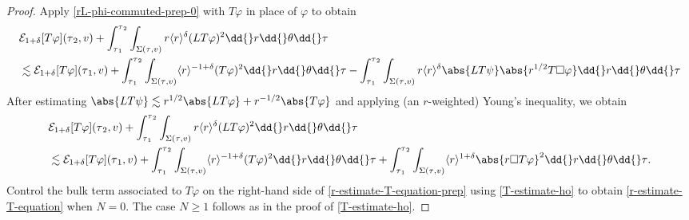 \documentclass[10pt, reqno]{amsart}
\begin{document}
\begin{proof}
Apply \cref{rL-phi-commuted-prep-0} with \(T\varphi{}\) in place of \(\varphi{}\) to obtain
\begin{equation}
\begin{split}
&\mathcal{E}_{1+\delta{}}[T\varphi{}](\tau{}_2,v) + \int_{\tau{}_1}^{\tau{}_2} \int _{\Sigma{}(\tau{},v)} r\langle{}r\rangle{}^\delta{}(LT\varphi{})^2\dd{}r\dd{}\theta{}\dd{}\tau{} \\
&\lesssim \mathcal{E}_{1+\delta{}}[T\varphi{}](\tau{}_1,v) +  \int_{\tau{}_1}^{\tau{}_2} \int _{\Sigma{}(\tau{},v)} \langle{}r\rangle^{-1+\delta{}}(T\varphi{})^2\dd{}r\dd{}\theta{}\dd{}\tau{} - \int_{\tau{}_1}^{\tau{}_2} \int _{\Sigma{}(\tau{},v)} r\langle{}r\rangle^\delta{}\abs{LT\psi{}}\abs{r^{1/2}T\Box{}\varphi{}}\dd{}r\dd{}\theta{}\dd{}\tau{}
\end{split}
\end{equation}
After estimating \(\abs{LT\psi{}}\lesssim r^{1/2}\abs{LT\varphi{}} + r^{-1/2}\abs{T\varphi{}}\) and applying (an \(r\)-weighted)
Young's inequality, we obtain
\begin{equation}\label{r-estimate-T-equation-prep}
\begin{split}
&\mathcal{E}_{1+\delta{}}[T\varphi{}](\tau{}_2,v) + \int_{\tau{}_1}^{\tau{}_2} \int _{\Sigma{}(\tau{},v)}r\langle{}r\rangle^\delta{}(LT\varphi{})^2\dd{}r\dd{}\theta{}\dd{}\tau{} \\
&\lesssim \mathcal{E}_{1+\delta{}}[T\varphi{}](\tau{}_1,v) + \int_{\tau{}_1}^{\tau{}_2} \int _{\Sigma{}(\tau{},v)}\langle{}r\rangle^{-1+\delta{}}(T\varphi{})^2\dd{}r\dd{}\theta{}\dd{}\tau{} + \int_{\tau{}_1}^{\tau{}_2}\int _{\Sigma{}(\tau{},v)} \langle{}r\rangle^{1+\delta{}}\abs{r\Box{}T\varphi{}}^2\dd{}r\dd{}\theta{}\dd{}\tau{}.
\end{split}
\end{equation}
Control the bulk term associated to \(T\varphi{}\) on the right-hand side of
\cref{r-estimate-T-equation-prep} using \cref{T-estimate-ho} to obtain
\cref{r-estimate-T-equation} when \(N = 0\). The case \(N\ge 1\) follows as in the
proof of \cref{T-estimate-ho}.
\end{proof}
\end{document}
